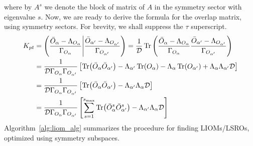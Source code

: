   where by \(A^s\) we denote the block of matrix of \(A\) in the symmetry sector with eigenvalue \(s\).
  Now, we are ready to derive the formula for the overlap matrix, using symmetry sectors. For brevity,
  we shall suppress the \(\tau\) superscript.
  \begin{align}
    K_{pt} &= \left(\frac{\bar{O}_{\alpha} - \Lambda_{O_{\alpha}}}{\Gamma_{O_{\alpha}}} \middle| \frac{\bar{O}_{\alpha^{\prime}} - \Lambda_{O_{\alpha^{\prime}}}}{\Gamma_{O_{\alpha^{\prime}}}}\right)
    = \frac{1}{\mathcal{D}} \Tr\left(\frac{\bar{O}_{\alpha} - \Lambda_{O_{\alpha}}}{\Gamma_{O_{\alpha}}}\frac{\bar{O}_{\alpha^{\prime}} - \Lambda_{O_{\alpha^{\prime}}}}{\Gamma_{O_{\alpha^{\prime}}}}\right) \nonumber \\
    &= \frac{1}{\mathcal{D} \Gamma_{O_{\alpha}}\Gamma_{O_{\alpha^{\prime}}}} \left[\Tr(\bar{O}_{\alpha} \bar{O}_{\alpha^{\prime}}) - \Lambda_{\alpha^{\prime}} \Tr(O_{\alpha}) - \Lambda_{\alpha} \Tr(O_{\alpha^{\prime}}) + \Lambda_{\alpha} \Lambda_{\alpha^{\prime}} \mathcal{D} \right]\nonumber\\
    &= \frac{1}{\mathcal{D} \Gamma_{O_{\alpha}}\Gamma_{O_{\alpha^{\prime}}}} \left[\Tr(\bar{O}_{\alpha} \bar{O}_{\alpha^{\prime}}) - \Lambda_{\alpha^{\prime}} \Lambda_{\alpha} \mathcal{D} \right] \nonumber\\
    &= \frac{1}{\mathcal{D} \Gamma_{O_{\alpha}}\Gamma_{O_{\alpha^{\prime}}}} \left[\sum_{s=1}^{s_{\text{max}}} \Tr(\bar{O}_{\alpha}^s \bar{O}_{\alpha^{\prime}}^s) - \Lambda_{\alpha^{\prime}} \Lambda_{\alpha} \mathcal{D} \right]
  \end{align}
  Algorithm~\ref{alg:liom_alg} summarizes the procedure for finding LIOMs/LSROs, optimized using symmetry subspaces.

